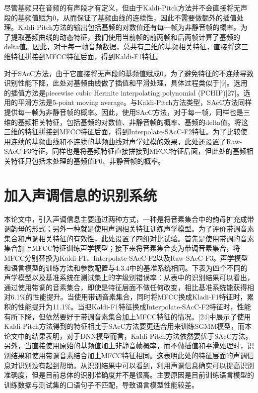 尽管基频只在音频的有声段才有定义，但由于Kaldi-Pitch方法并不会直接将无声段的基频值赋为0，从而保证了基频曲线的连续性，因此不需要做额外的插值处理。Kaldi-Pitch方法的输出包括基频的对数值还有每一帧为非静音帧的概率。为了提取基频曲线的动态特征，我们使用当前帧的前两帧和后两帧计算了基频的delta值。因此，对于每一帧音频数据，总共有三维的基频相关特征，直接将这三维特征拼接到MFCC特征后面，得到Kaldi-F1特征。

对于SAcC方法，由于它直接将无声段的基频值赋成0，为了避免特征的不连续导致识别性能下降，此处对基频曲线做了插值和平滑处理，具体过程类似于[9]。选用的插值方法是piecewise cubic Hermite interpolating polynomial (PCHIP)[27]。选用的平滑方法是5-point moving average。与Kaldi-Pitch方法类型，SAcC方法同样提供每一帧为非静音帧的概率。因此，使用SAcC方法，对于每一帧，同样也是三维的基频相关特征，包括基频的对数值、非静音帧的概率、基频的delta值。将这三维的特征拼接到MFCC特征后面，得到Interpolate-SAcC-F2特征。为了比较使用连续的基频曲线和不连续的基频曲线对声学建模的效果，此处还设置了Raw-SAcC-F3特征，同样也是将基频特征直接拼接到MFCC特征后面，但此处的基频相关特征只包括未处理的基频值F0、非静音帧的概率。
\section{加入声调信息的识别系统}
本论文中，引入声调信息主要通过两种方式，一种是将音素集合中的韵母扩充成带调韵母的形式；另外一种就是使用声调相关特征训练声学模型。为了评价带调音素集合和声调相关特征的有效性，此处设置了四组对比试验。首先是使用带调的音素集合加上MFCC特征训练声学模型；接下来将音素集合变为带调音素集合，将MFCC分别替换为Kaldi-F1、Interpolate-SAcC-F2以及Raw-SAcC-F3。声学模型和语言模型的训练方法和参数配置与4.3.4中的基准系统相同。下表为四个不同的声学模型以及基准系统在测试集上的字级别错误率：{\color{red}{补充期刊论文表4}}从表中的识别结果可以看出，通过使用带调的音素集合，即使是特征层面不做任何改变，相比基准系统能获得相对6.1\%的性能提升。当使用带调音素集合，同时将MFCC换成Kladi-F1特征时，累积的性能提升为11.1\%。当把Kaldi-F1特征换成Interpolate-SAcC-F2特征时，性能有所下降，但依然要好于带调音素集合加上MFCC特征的情况。[24]中展示了使用Kaldi-Pitch方法得到的特征相比于SAcC方法要更适合用来训练SGMM模型，而本论文中的结果表明，对于DNN模型而言，Kaldi-Pitch方法依然要优于SAcC方法。另外，当直接使用原始的基频值加上非静音帧概率，而不做插值和平滑处理时，识别结果和使用带调音素结合加上MFCC特征相同。这表明此处的特征层面的声调信息对识别没有起到帮助。从识别结果中可以看到，利用声调信息确实可以提高识别准确度，但是目前总体的识别准确度并不是很高。主要原因是目前训练语言模型的训练数据与测试集的口语句子不匹配，导致语言模型性能较差。
